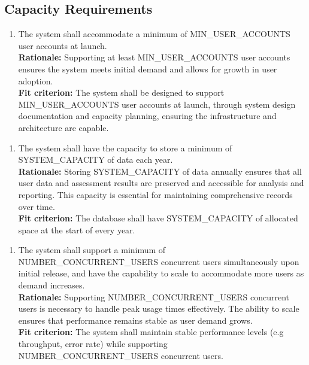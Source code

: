 \documentclass[12pt]{article}
\begin{document}
\subsection{Capacity Requirements}
\begin{enumerate}[label={PR-CR}1. ]
  \item The system shall accommodate a minimum of MIN\_USER\_ACCOUNTS user accounts at launch.\\
  \textbf{Rationale: }Supporting at least MIN\_USER\_ACCOUNTS user accounts ensures the system meets initial demand and allows for growth in user adoption.\\
  \textbf{Fit criterion: }The system shall be designed to support\\ MIN\_USER\_ACCOUNTS user accounts at launch, through system design documentation and capacity planning, ensuring the infrastructure and architecture are capable.
\end{enumerate}
\begin{enumerate}[label={PR-CR}2. ]
  \item The system shall have the capacity to store a minimum of\\ SYSTEM\_CAPACITY of data each year.\\
  \textbf{Rationale: }Storing SYSTEM\_CAPACITY of data annually ensures that all user data and assessment results are preserved and accessible for analysis and reporting. This capacity is essential for maintaining comprehensive records over time.\\
  \textbf{Fit criterion: }The database shall have SYSTEM\_CAPACITY of allocated space at the start of every year.  
\end{enumerate}
\begin{enumerate}[label={PR-CR}3. ]
  \item The system shall support a minimum of\\ NUMBER\_CONCURRENT\_USERS concurrent users simultaneously upon initial release, and have the capability to scale to accommodate more users as demand increases.\\
  \textbf{Rationale: }Supporting NUMBER\_CONCURRENT\_USERS concurrent users is necessary to handle peak usage times effectively. The ability to scale ensures that performance remains stable as user demand grows.\\
  \textbf{Fit criterion: }The system shall maintain stable performance levels (e.g throughput, error rate) while supporting\\ NUMBER\_CONCURRENT\_USERS concurrent users.  
\end{enumerate}
\end{document}
